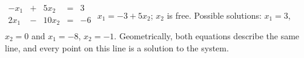 {$\begin{array}{ccccc}
-x_1&+&5x_2&=&3\\
2x_1&-&10x_2&=&-6\\
\end{array}$}
{$x_1=-3+5x_2$; $x_2$ is free. Possible solutions: $x_1 = 3$, $x_2=0$ and $x_1 = -8$, $x_2 = -1$. Geometrically, both equations describe the same line, and every point on this line is a solution to the system.}